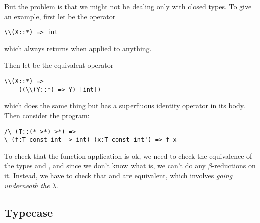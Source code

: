 \message{ !name(report.tex)}\documentclass[pageno]{jpaper}
\begin{document}
{{{But the problem is that we might not be dealing only with closed types. To give an example, first let
 be the operator
\begin{lstlisting}
\\(X::*) => int
\end{lstlisting}

which always returns  when applied to anything.

Then let  be the equivalent operator
\begin{lstlisting}
\\(X::*) =>
    ((\\(Y::*) => Y) [int])
\end{lstlisting}

which does the same thing but has a superfluous identity operator in its body.
Then consider the program:
\begin{lstlisting}
/\ (T::(*->*)->*) =>
\ (f:T const_int -> int) (x:T const_int') => f x
\end{lstlisting}

To check that the function application  is ok, we need to check the equivalence of the types
 and , and since we don't know what  is, we can't do any
$\beta$-reductions on it. Instead, we have to check that  and  are equivalent,
which involves \textit{going underneath the $\lambda$}.

%

\subsection{Typecase}

}}}
\end{document}
